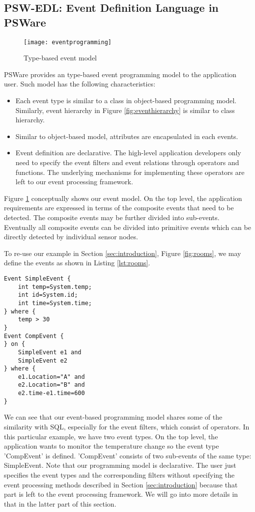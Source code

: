 \subsection{PSW-EDL: Event Definition Language in PSWare}
\begin{figure}
\centering
\texttt{[image: eventprogramming]}
\caption{Type-based event model}
\label{fig:eventprogramming}
\end{figure}

PSWare provides an type-based event programming model to the application user. Such model has the following characteristics:
\begin{itemize}
\item Each event type is similar to a class in object-based programming model. Similarly, event hierarchy in Figure \ref{fig:eventhierarchy} is similar to class hierarchy.
\item Similar to object-based model, attributes are encapsulated in each events.
\item Event definition are declarative. The high-level application developers only need to specify the event filters and event relations through operators and functions. The underlying mechanisms for implementing these operators are left to our event processing framework.
\end{itemize}

Figure \ref{fig:eventprogramming} conceptually shows our event model. On the top level, the application requirements are expressed in terms of the composite events that need to be detected. The composite events may be further divided into sub-events. Eventually all composite events can be divided into primitive events which can be directly detected by individual sensor nodes.

To re-use our example in Section \ref{sec:introduction}, Figure \ref{fig:rooms}, we may define the events as shown in Listing \ref{lst:rooms}.
\begin{lstlisting}[caption=Example of using even-based programming model, label=lst:rooms]
Event SimpleEvent {
	int temp=System.temp;
	int id=System.id;
	int time=System.time;
} where {
	temp > 30
}
Event CompEvent {
} on {
	SimpleEvent e1 and
	SimpleEvent e2
} where {
	e1.Location="A" and
	e2.Location="B" and
	e2.time-e1.time=600
}
\end{lstlisting}

We can see that our event-based programming model shares some of the similarity with SQL, especially for the event filters, which consist of operators. In this particular example, we have two event types. On the top level, the application wants to monitor the temperature change so the event type 'CompEvent' is defined. 'CompEvent' consists of two sub-events of the same type: SimpleEvent. Note that our programming model is declarative. The user just specifies the event types and the corresponding filters without specifying the event processing methods described in Section \ref{sec:introduction} because that part is left to the event processing framework. We will go into more details in that in the latter part of this section.

